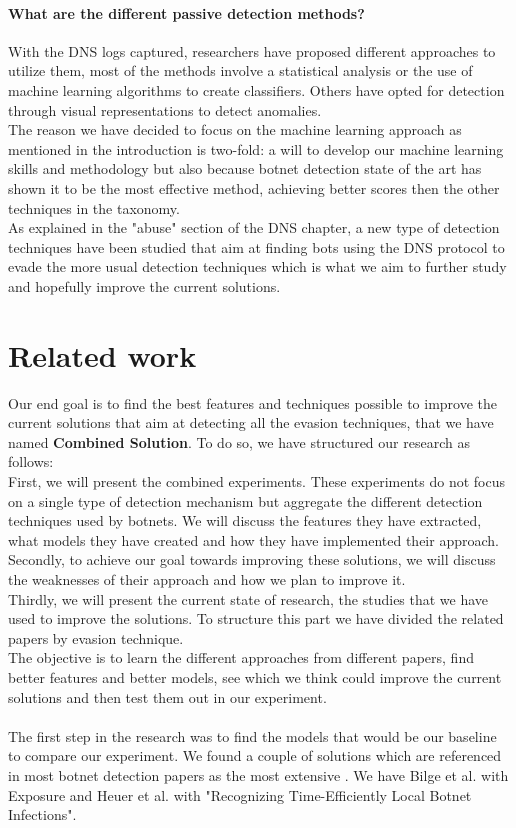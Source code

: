 \paragraph{What are the different passive detection methods?}
With the DNS logs captured, researchers have proposed different approaches to utilize them, most of the methods involve a statistical analysis or the use of machine learning algorithms to create classifiers. Others have opted for detection through visual representations to detect anomalies.\\
The reason we have decided to focus on the machine learning approach as mentioned in the introduction is two-fold: a will to develop our machine learning skills and methodology but also because botnet detection state of the art has shown it to be the most effective method, achieving better scores then the other techniques in the taxonomy.\\
As explained in the "abuse" section of the DNS chapter, a new type of detection techniques have been studied that aim at finding bots using the DNS protocol to evade the more usual detection techniques which is what we aim to further study and hopefully improve the current solutions.

\section{Related work}
Our end goal is to find the best features and techniques possible to improve the current solutions that aim at detecting all the evasion techniques, that we have named \textbf{Combined Solution}. To do so, we have structured our research as follows:\\
First, we will present the combined experiments. These experiments do not focus on a single type of detection mechanism but aggregate the different detection techniques used by botnets. We will discuss the features they have extracted, what models they have created and how they have implemented their approach.\\
Secondly, to achieve our goal towards improving these solutions, we will discuss the weaknesses of their approach and how we plan to improve it.\\
Thirdly, we will present the current state of research, the studies that we have used to improve the solutions. To structure this part we have divided the related papers by evasion technique.\\
The objective is to learn the different approaches from different papers, find better features and better models, see which we think could improve the current solutions and then test them out in our experiment.\\
\\
The first step in the research was to find the models that would be our baseline to compare our experiment. We found a couple of solutions which are referenced in most botnet detection papers as the most extensive . We have Bilge et al.\cite{exposure} with Exposure and Heuer et al.\cite{localbotnet} with "Recognizing Time-Efficiently Local Botnet Infections".

